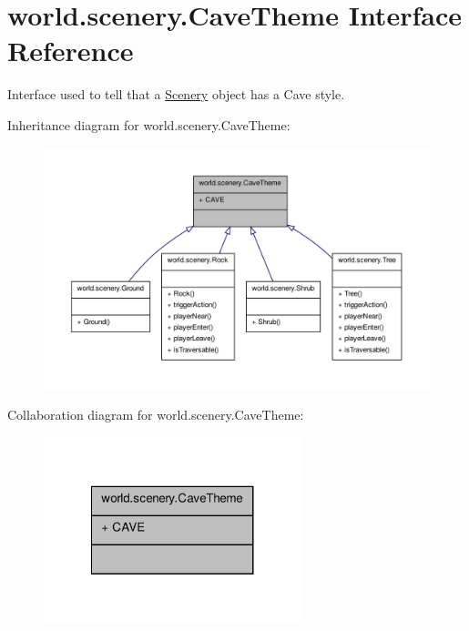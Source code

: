 \hypertarget{interfaceworld_1_1scenery_1_1_cave_theme}{\section{world.\-scenery.\-Cave\-Theme Interface Reference}
\label{interfaceworld_1_1scenery_1_1_cave_theme}
}


Interface used to tell that a \hyperlink{classworld_1_1scenery_1_1_scenery}{Scenery} object has a Cave style.  




Inheritance diagram for world.\-scenery.\-Cave\-Theme\-:\nopagebreak
\begin{figure}[H]
\begin{center}
\leavevmode
\includegraphics[width=350pt]{interfaceworld_1_1scenery_1_1_cave_theme__inherit__graph}
\end{center}
\end{figure}


Collaboration diagram for world.\-scenery.\-Cave\-Theme\-:\nopagebreak
\begin{figure}[H]
\begin{center}
\leavevmode
\includegraphics[width=212pt]{interfaceworld_1_1scenery_1_1_cave_theme__coll__graph}
\end{center}
\end{figure}
